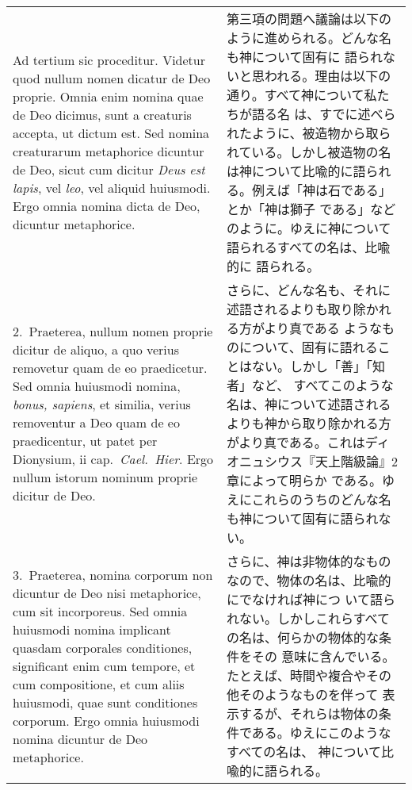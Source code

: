 \documentclass[10pt]{jsarticle} %
\begin{document}
\begin{longtable}{p{21em}p{21em}}

{\sc Ad tertium sic proceditur}. Videtur quod nullum nomen dicatur de
Deo proprie. Omnia enim nomina quae de Deo dicimus, sunt a creaturis
accepta, ut dictum est. Sed nomina creaturarum metaphorice dicuntur de
Deo, sicut cum dicitur {\it Deus est lapis}, vel {\it leo}, vel
aliquid huiusmodi. Ergo omnia nomina dicta de Deo, dicuntur
metaphorice.

&

第三項の問題へ議論は以下のように進められる。どんな名も神について固有に
語られないと思われる。理由は以下の通り。すべて神について私たちが語る名
は、すでに述べられたように、被造物から取られている。しかし被造物の名
は神について比喩的に語られる。例えば「神は石である」とか「神は獅子
である」などのように。ゆえに神について語られるすべての名は、比喩的に
語られる。



\\


2.~{\sc Praeterea}, nullum nomen proprie dicitur de aliquo, a quo
verius removetur quam de eo praedicetur. Sed omnia huiusmodi nomina,
{\it bonus, sapiens}, et similia, verius removentur a Deo quam de eo
praedicentur, ut patet per Dionysium, {\sc ii} cap.\ {\it Cael.\
Hier}. Ergo nullum istorum nominum proprie dicitur de Deo.


&

さらに、どんな名も、それに述語されるよりも取り除かれる方がより真である
ようなものについて、固有に語れることはない。しかし「善」「知者」など、
すべてこのような名は、神について述語されるよりも神から取り除かれる方
がより真である。これはディオニュシウス『天上階級論』2章によって明らか
である。ゆえにこれらのうちのどんな名も神について固有に語られない。



\\




3.~{\sc Praeterea}, nomina corporum non dicuntur de Deo nisi
metaphorice, cum sit incorporeus. Sed omnia huiusmodi nomina implicant
quasdam corporales conditiones, significant enim cum tempore, et cum
compositione, et cum aliis huiusmodi, quae sunt conditiones
corporum. Ergo omnia huiusmodi nomina dicuntur de Deo metaphorice.


&

さらに、神は非物体的なものなので、物体の名は、比喩的にでなければ神につ
いて語られない。しかしこれらすべての名は、何らかの物体的な条件をその
意味に含んでいる。たとえば、時間や複合やその他そのようなものを伴って
表示するが、それらは物体の条件である。ゆえにこのようなすべての名は、
神について比喩的に語られる。



\end{longtable}
\end{document}
